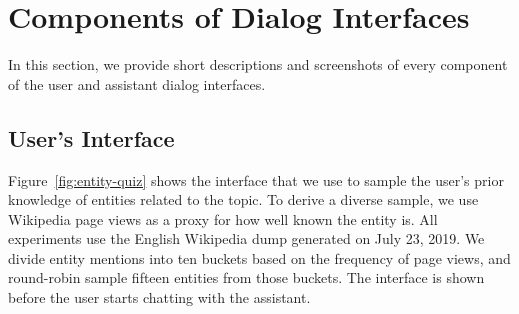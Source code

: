 \appendix

\section{Components of Dialog Interfaces}
\label{apx:int-photos}
In this section, we provide short descriptions and screenshots of every component of the user and assistant dialog interfaces.

\subsection{User's Interface}

Figure~\ref{fig:entity-quiz} shows the interface that we use to sample the user's prior knowledge of entities related to the topic.
To derive a diverse sample, we use Wikipedia page views as a proxy for how well known the entity is.
All experiments use the English Wikipedia dump generated on July 23, 2019.
We divide entity mentions into ten buckets based on the frequency of page views, and round-robin sample fifteen entities from those buckets.
The interface is shown before the user starts chatting with the assistant.
